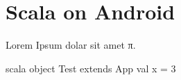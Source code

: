 \section{Scala on Android}

Lorem Ipsum dolar sit amet π.

\begin{code}{scala}
object Test extends App
{
	val x = 3
}
\end{code}